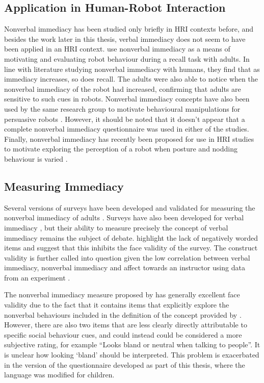 \subsection{Application in Human-Robot Interaction}
Nonverbal immediacy has been studied only briefly in HRI contexts before, and besides the work later in this thesis, verbal immediacy does not seem to have been applied in an HRI context. \citet{szafir2012pay} use nonverbal immediacy as a means of motivating and evaluating robot behaviour during a recall task with adults. In line with literature studying nonverbal immediacy with humans, they find that as immediacy increases, so does recall. The adults were also able to notice when the nonverbal immediacy of the robot had increased, confirming that adults are sensitive to such cues in robots. Nonverbal immediacy concepts have also been used by the same research group to motivate behavioural manipulations for persuasive robots \citep{chidambaram2012designing}. However, it should be noted that it doesn't appear that a complete nonverbal immediacy questionnaire was used in either of the studies. Finally, nonverbal immediacy has recently been proposed for use in HRI studies to motivate exploring the perception of a robot when posture and nodding behaviour is varied \citep{jeong2015interested}.

\subsection{Measuring Immediacy}
Several versions of surveys have been developed and validated for measuring the nonverbal immediacy of adults \citep{richmond2003development}. Surveys have also been developed for verbal immediacy \citep{gorham1988relationship}, but their ability to measure precisely the concept of verbal immediacy remains the subject of debate. \citet{robinson1995validity} highlight the lack of negatively worded items and suggest that this inhibits the face validity of the survey. The construct validity is further called into question given the low correlation between verbal immediacy, nonverbal immediacy and affect towards an instructor using data from an experiment \citep{robinson1995validity}.

The nonverbal immediacy measure proposed by \citet{richmond2003development} has generally excellent face validity due to the fact that it contains items that explicitly explore the nonverbal behaviours included in the definition of the concept provided by \citet{mehrabian1968some}. However, there are also two items that are less clearly directly attributable to specific social behaviour cues, and could instead could be considered a more subjective rating, for example ``Looks bland or neutral when talking to people''. It is unclear how looking `bland' should be interpreted. This problem is exacerbated in the version of the questionnaire developed as part of this thesis, where the language was modified for children.

